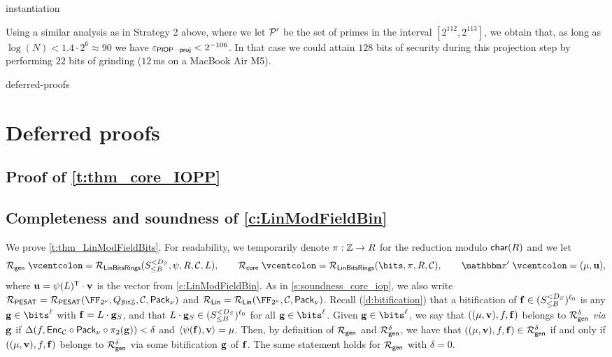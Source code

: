 \begin{lncsappendix}{instantiation}
\begin{remark}
    Using a similar analysis as in Strategy 2 above, where we let $\mathcal{P}'$ be the set of primes in the interval $[2^{112}, 2^{113}]$,  we obtain that, as long as $\log(N)< 1.4\cdot 2^{6}\approx 90$ we have $   \varepsilon_{\mathsf{PIOP-proj}}< 2^{-106}$. In that case we could attain $128$ bits of security during this projection step by performing $22$ bits of grinding ($12$\,ms on a MacBook Air M5).
\end{remark}

\end{lncsappendix}
\begin{lncsappendix}{deferred-proofs}%
\section{Deferred proofs}
\iflncs

\subsection{Proof of \cref{t:thm_core_IOPP}}\label{a:core_iop_proofs}
\fi
{}



\subsection{Completeness and soundness of \cref{c:LinModFieldBin}}\label{a:LinModFieldBin}


We prove \cref{t:thm_LinModFieldBits}. For readability, we temporarily denote   $\pi:\mathbb{Z}\to R$ for the reduction modulo $\mathsf{char}(R)$ and we let
%
\iflncs\begingroup\scriptsize\fi
$$
\Relation_{\mathsf{gen}}\defeq \LinModFieldBin(\moduleonebound,\modulemorphism,\moduletwo,  \cC,L), \qquad \Relation_{\mathsf{core}}\defeq \LinBitsDual(\bits,\pi, R,\cC), \qquad \inp'\defeq (\mu,\uu),
$$
\iflncs\endgroup\fi
%
where $\mathbf{u}=\psi(L)^{\mathsf{T}}\cdot \mathbf{v}$ is the vector from \cref{c:LinModFieldBin}. As in \cref{s:soundness_core_iop}, we also write $\PESAT=\PESAT(\comfield,\lncsbreak Q_{\mathbb{B}\text{it}\ZZ},\lncsbreak\cC,\lncsbreak \pack)$ and $\LIN = \LIN(\comfield,\lncsbreak \cC,\lncsbreak \pack)$.
Recall (\cref{d:bitification}) that a bitification of $\mathbf{f}\in ({S_{\leq B}^{<D_S}})^{\ell_0}$ is any $\bfg\in \bits^{\codedim}$ with $\mathbf{f}=L\cdot \mathbf{g}_S$, and that $L\cdot \mathbf{g}_S\in ({S_{\leq B}^{<D_S}})^{\ell_0}$ for all $\bfg\in \bits^{\codedim}$. Given $\bfg\in \bits^{\codedim}$, we say that $((\mu,\mathbf{v}),f,\mathbf{f})$ belongs to $\mathcal{R}_{\mathsf{gen}}^{\delta}$ \emph{via} $\mathbf{g}$ if $\Delta(f,\mathsf{Enc}_{\mathcal{C}}\circ \mathsf{Pack}_\nu\circ \pi_2(\mathbf{g}))<\delta$ and $\langle \psi(\mathbf{f}),\mathbf{v}\rangle=\mu$. Then, by definition of $\mathcal{R}_{\mathsf{gen}}$ and $\mathcal{R}_{\mathsf{gen}}^{\delta}$, we have that  $((\mu,\mathbf{v}),f,\mathbf{f})\in \mathcal{R}_{\mathsf{gen}}^{\delta}$ if and only if $((\mu,\mathbf{v}),f,\mathbf{f})$ belongs to $\mathcal{R}_{\mathsf{gen}}^{\delta}$ via some bitification $\mathbf{g}$ of $\mathbf{f}$. The same statement holds for $\mathcal{R}_{\mathsf{gen}}$  with $\delta=0$.


\end{lncsappendix}

